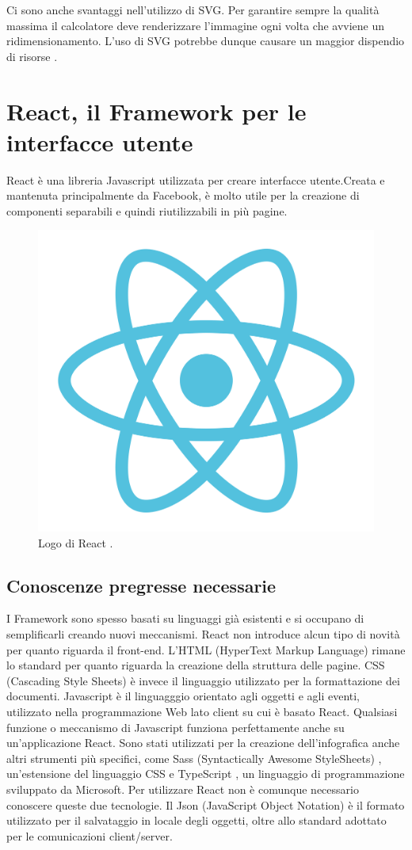 \noindent Ci sono anche svantaggi nell'utilizzo di SVG. Per garantire sempre la qualità massima il calcolatore deve renderizzare l'immagine ogni volta che avviene un ridimensionamento. L'uso di SVG potrebbe dunque causare un maggior dispendio di risorse \cite{svgOfficial}.
\section{React, il Framework per le interfacce utente}
\noindent React \cite{reactPage} è una libreria Javascript utilizzata per creare interfacce utente.\newline Creata e mantenuta 
principalmente da Facebook, è molto utile per la creazione di componenti separabili e quindi riutilizzabili in più pagine.\newline

\begin{figure}[H]
    \centering
    \includegraphics[width=0.3\linewidth]{img/react.png}
    \caption{Logo di React \cite{reactImg}.}
    \label{reactLogo}
\end{figure}
\subsection{Conoscenze pregresse necessarie}
\noindent I Framework sono spesso basati su linguaggi già esistenti e si occupano di semplificarli creando nuovi meccanismi.\newline
React non introduce alcun tipo di novità per quanto riguarda il front-end.
L'HTML (HyperText Markup Language) rimane lo standard per quanto riguarda la creazione della struttura delle pagine. \newline
CSS (Cascading Style Sheets) è invece il linguaggio utilizzato per la formattazione dei documenti.\newline
Javascript è il linguagggio orientato agli oggetti e agli eventi, utilizzato nella programmazione Web lato client su cui è basato React. Qualsiasi funzione o meccanismo di Javascript funziona perfettamente anche su un'applicazione React.\newline
Sono stati utilizzati per la creazione dell'infografica anche altri strumenti più specifici, come Sass (Syntactically Awesome StyleSheets) \cite{sass}, un'estensione del linguaggio CSS e TypeScript \cite{typescript}, un linguaggio di programmazione sviluppato da Microsoft. Per utilizzare React non è comunque necessario conoscere queste due tecnologie.\newline
Il Json (JavaScript Object Notation) è il formato utilizzato per il salvataggio in locale degli oggetti, oltre allo standard adottato per le comunicazioni client/server.

